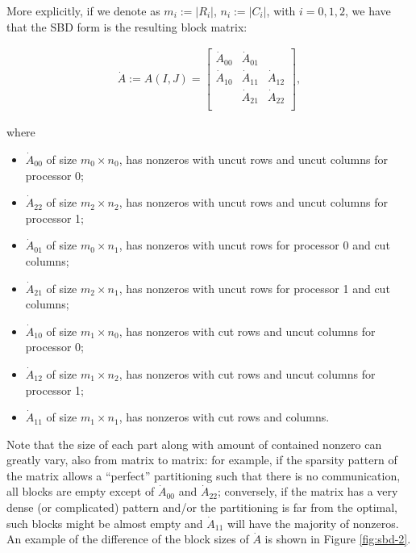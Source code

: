 More explicitly, if we denote as $m_i := |R_i|$, $n_i := |C_i|$, with $i=0,1,2$, we have that the SBD form is the resulting block matrix:

\begin{align}\dot{A} := A(I,J) = 
	\begin{bmatrix}
		\dot{A}_{00} & \dot{A}_{01}  & \\
		\dot{A}_{10} & \dot{A}_{11} & \dot{A}_{12} \\
		& \dot{A}_{21} & \dot{A}_{22} \\ 
	\end{bmatrix}, \label{eq:sbd}
\end{align}

where

\begin{itemize}
	\item $\dot{A}_{00}$ of size $m_0 \times n_0$, has nonzeros with uncut rows and uncut columns for processor 0;
	\item $\dot{A}_{22}$ of size $m_2 \times n_2$, has nonzeros with uncut rows and uncut columns for processor 1;
	\item $\dot{A}_{01}$ of size $m_0 \times n_1$, has nonzeros with uncut rows for processor 0 and cut columns;
	\item $\dot{A}_{21}$ of size $m_2 \times n_1$, has nonzeros with uncut rows for processor 1 and cut columns;
	\item $\dot{A}_{10}$ of size $m_1 \times n_0$, has nonzeros with cut rows and uncut columns for processor 0;
	\item $\dot{A}_{12}$ of size $m_1 \times n_2$, has nonzeros with cut rows and uncut columns for processor 1;
	\item $\dot{A}_{11}$ of size $m_1 \times n_1$, has nonzeros with cut rows and columns.
\end{itemize}

Note that the size of each part along with amount of contained nonzero can greatly vary, also from matrix to matrix: for example, if the sparsity pattern of the matrix allows a ``perfect'' partitioning such that there is no communication, all blocks are empty except of $\dot{A}_{00}$ and $\dot{A}_{22}$; conversely, if the matrix has a very dense (or complicated) pattern and/or the partitioning is far from the optimal, such blocks might be almost empty and $\dot{A}_{11}$ will have the majority of nonzeros. An example of the difference of the block sizes of $\dot{A}$ is shown in Figure \ref{fig:sbd-2}.

